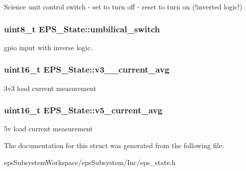 Science unit control switch -\/ set to turn off -\/ reset to turn on (!inverted logic!) \hypertarget{struct_e_p_s___state_a87847b892dfaad1873366d7b80921ba5}{
\subsubsection[{umbilical\-\_\-switch}]{\setlength{\rightskip}{0pt plus 5cm}uint8\-\_\-t E\-P\-S\-\_\-\-State\-::umbilical\-\_\-switch}}\label{struct_e_p_s___state_a87847b892dfaad1873366d7b80921ba5}
gpio input with inverse logic. \hypertarget{struct_e_p_s___state_a56c6787cc19c48659400ea2ed1f71c15}{
\subsubsection[{v3\-\_\-3\-\_\-current\-\_\-avg}]{\setlength{\rightskip}{0pt plus 5cm}uint16\-\_\-t E\-P\-S\-\_\-\-State\-::v3\-\_\-\_\-current\-\_\-avg}}\label{struct_e_p_s___state_a56c6787cc19c48659400ea2ed1f71c15}
3v3 load current measurement \hypertarget{struct_e_p_s___state_a732d523021005336fdd18ff961475bac}{
\subsubsection[{v5\-\_\-current\-\_\-avg}]{\setlength{\rightskip}{0pt plus 5cm}uint16\-\_\-t E\-P\-S\-\_\-\-State\-::v5\-\_\-current\-\_\-avg}}\label{struct_e_p_s___state_a732d523021005336fdd18ff961475bac}
5v load current measurement 

The documentation for this struct was generated from the following file\-:\begin{DoxyCompactItemize}
\item 
eps\-Subsystem\-Workspace/eps\-Subsystem/\-Inc/eps\-\_\-state.\-h\end{DoxyCompactItemize}
